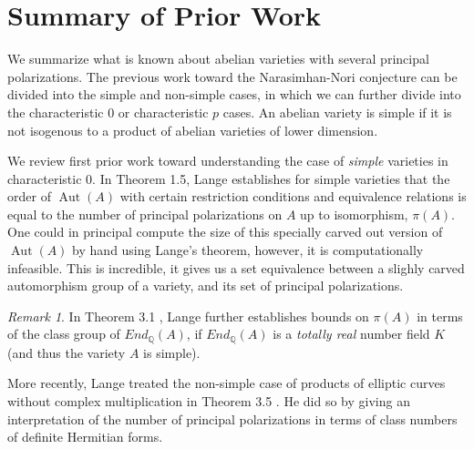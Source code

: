 \documentclass[12pt,reqno]{amsart}
\DeclareMathOperator{\Aut}{Aut}
\newcommand{\Q}{\mathbb{Q}}
\theoremstyle{definition}
\theoremstyle{remark}
\newtheorem*{remark}{Remark}
\begin{document}
\section{Summary of Prior Work}

We summarize what is known about abelian varieties with several principal polarizations. The previous work toward the Narasimhan-Nori conjecture can be divided into the simple and non-simple cases, in which we can further divide into the characteristic 0 or characteristic $p$ cases. An abelian variety is simple if it is not isogenous to a product of abelian varieties of lower dimension. 

We review first prior work toward understanding the case of \textit{simple} varieties in characteristic 0. In \cite{several} Theorem 1.5, Lange establishes for simple varieties that the order of $\Aut(A)$ with certain restriction conditions and equivalence relations is equal to the number of principal polarizations on $A$ up to isomorphism, $\pi(A)$. One could in principal compute the size of this specially carved out version of $\Aut(A)$ by hand using Lange's theorem, however, it is computationally infeasible. This is incredible, it gives us a set equivalence between a slighly carved automorphism group of a variety, and its set of principal polarizations.



\begin{remark} In Theorem 3.1 \cite{several}, Lange further establishes bounds on $\pi(A)$ in terms of the class group of $End_{\Q}(A)$, if $End_{\Q}(A)$ is a \textit{totally real} number field $K$ (and thus the variety $A$ is simple). \end{remark}  

More recently, Lange treated the non-simple case of products of elliptic curves without complex multiplication in Theorem 3.5 \cite{newlange}. He did so by giving an interpretation of the number of principal polarizations in terms of class numbers of definite Hermitian forms.

\end{document}
